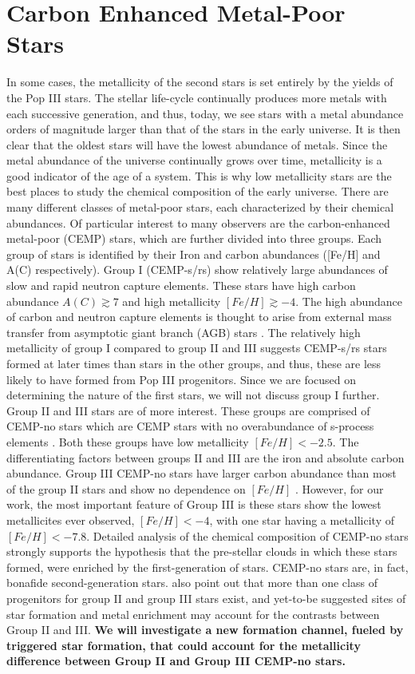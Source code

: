\documentclass[12pt]{article}
\begin{document}
\section{Carbon Enhanced Metal-Poor Stars}

In some cases, the metallicity of the second stars is set entirely by the yields of the Pop III stars. The stellar life-cycle continually produces more metals with each successive generation, and thus, today, we see stars with a metal abundance orders of magnitude larger than that of the stars in the early universe. It is then clear that the oldest stars will have the lowest abundance of metals. Since the metal abundance of the universe continually grows over time, metallicity is a good indicator of the age of a system. This is why low metallicity stars are the best places to study the chemical composition of the early universe. There are many different classes of metal-poor stars, each characterized by their chemical abundances. Of particular interest to many observers are the carbon-enhanced metal-poor (CEMP) stars, which are further divided into three groups. Each group of stars is identified by their Iron and carbon abundances ([Fe/H] and A(C) respectively). Group I (CEMP-s/rs) show relatively large abundances of slow and rapid neutron capture elements. These stars have high carbon abundance $A(C) \gtrsim 7$ and high metallicity $[Fe/H] \gtrsim -4$. The high abundance of carbon and neutron capture elements is thought to arise from external mass transfer from asymptotic giant branch (AGB) stars \citep{Yoon2016}. The relatively high metallicity of group I compared to group II and III suggests CEMP-s/rs stars formed at later times than stars in the other groups, and thus, these are less likely to have formed from Pop III progenitors. Since we are focused on determining the nature of the first stars, we will not discuss group I further. Group II and III stars are of more interest. These groups are comprised of CEMP-no stars which are CEMP stars with no overabundance of s-process elements \citep{Maeder2015}. Both these groups have low metallicity $[Fe/H] < -2.5$. The differentiating factors between groups II and III are the iron and absolute carbon abundance. Group III CEMP-no stars have larger carbon abundance than most of the group II stars and show no dependence on $[Fe/H]$ \citep{Yoon2016}. However, for our work, the most important feature of Group III is these stars show the lowest metallicites ever observed, $[Fe/H] < -4$, with one star having a metallicity of $[Fe/H] < -7.8$. Detailed analysis of the chemical composition of CEMP-no stars strongly supports the hypothesis that the pre-stellar clouds in which these stars formed, were enriched by the first-generation of stars. CEMP-no stars are, in fact, bonafide second-generation stars. \cite{Yoon2016} also point out that more than one class of progenitors for group II and group III stars exist, and yet-to-be suggested sites of star formation and metal enrichment may account for the contrasts between Group II and III. \textbf{We will investigate a new formation channel, fueled by triggered star formation, that could account for the metallicity difference between Group II and Group III CEMP-no stars.}
\end{document}
